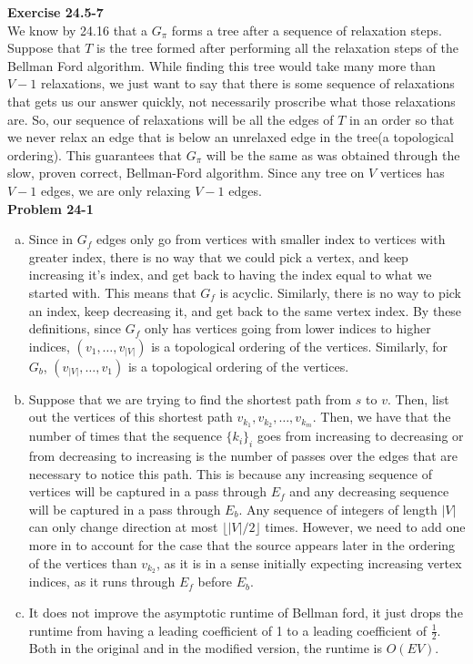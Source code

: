 \documentclass{article}
\begin{document}
\noindent\textbf{Exercise 24.5-7}\\
We know by 24.16 that a $G_\pi$ forms a tree after a sequence of relaxation steps. Suppose that $T$ is the tree formed after performing all the relaxation steps of the Bellman Ford algorithm. While finding this tree would take many more than $V-1$ relaxations, we just want to say that there is some sequence of relaxations that gets us our answer quickly, not necessarily proscribe what those relaxations are. So, our sequence of relaxations will be all the edges of $T$ in an order so that we never relax an edge that is below an unrelaxed edge in the tree(a topological ordering). This guarantees that $G_\pi$ will be the same as was obtained through the slow, proven correct, Bellman-Ford algorithm. Since any tree on $V$ vertices has $V-1$ edges, we are only relaxing $V-1$ edges.\\

\noindent\textbf{Problem 24-1}\\
\begin{enumerate}[a.]
\item
Since in $G_f$ edges only go from vertices with smaller index to vertices with greater index, there is no way that we could pick a vertex, and keep increasing it's index, and get back to having the index equal to what we started with. This means that $G_f$ is acyclic. Similarly, there is no way to pick an index, keep decreasing it, and get back to the same vertex index. By these definitions, since $G_f$ only has vertices going from lower indices to higher indices, $(v_1, \ldots,v_{|V|})$ is a topological ordering of the vertices. Similarly, for $G_b$, $(v_{|V|},\ldots,v_1)$ is a topological ordering of the vertices.

\item
Suppose that we are trying to find the shortest path from $s$ to $v$. Then, list out the vertices of this shortest path $v_{k_1}, v_{k_2}, \ldots, v_{k_m}$. Then, we have that the number of times that the sequence $\{k_i\}_i$ goes from increasing to decreasing or from decreasing to increasing is the number of passes over the edges that are necessary to notice this path. This is because any increasing sequence of vertices will be captured in a pass through $E_f$ and any decreasing sequence will be captured in a pass through $E_b$. Any sequence of integers of length $|V|$ can only change direction at most $\lfloor |V|/2\rfloor$ times. However, we need to add one more in to account for the case that the source appears later in the ordering of the vertices than $v_{k_2}$, as it is in a sense initially expecting increasing vertex indices, as it runs through $E_f$ before $E_b$.

\item
It does not improve the asymptotic runtime of Bellman ford, it just drops the runtime from having a leading coefficient of 1 to a leading coefficient of $\frac{1}{2}$. Both in the original and in the modified version, the runtime is $O(EV)$.
\end{enumerate}
\end{document}
